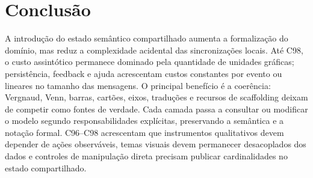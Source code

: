 \documentclass[12pt,a4paper]{article}
\begin{document}
\section{Conclusão}

A introdução do estado semântico compartilhado aumenta a formalização do domínio, mas reduz a complexidade acidental das sincronizações locais. Até C98, o custo assintótico permanece dominado pela quantidade de unidades gráficas; persistência, feedback e ajuda acrescentam custos constantes por evento ou lineares no tamanho das mensagens. O principal benefício é a coerência: Vergnaud, Venn, barras, cartões, eixos, traduções e recursos de scaffolding deixam de competir como fontes de verdade. Cada camada passa a consultar ou modificar o modelo segundo responsabilidades explícitas, preservando a semântica e a notação formal. C96--C98 acrescentam que instrumentos qualitativos devem depender de ações observáveis, temas visuais devem permanecer desacoplados dos dados e controles de manipulação direta precisam publicar cardinalidades no estado compartilhado.
\end{document}
